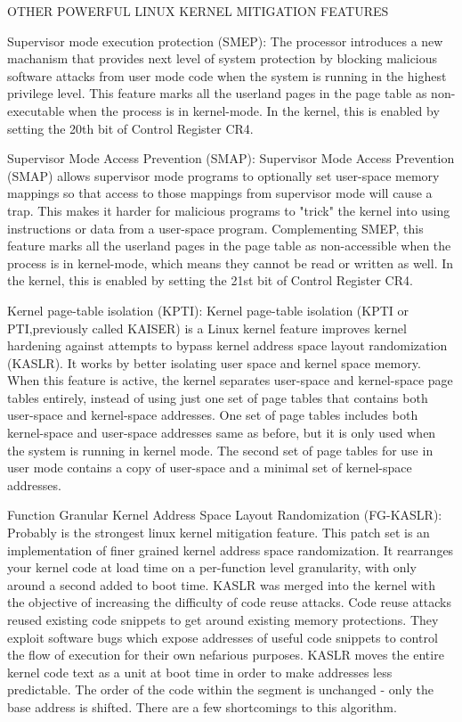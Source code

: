 \documentclass{masterthesis}
\begin{document}
\begin{itemize}
OTHER POWERFUL LINUX KERNEL MITIGATION FEATURES

Supervisor mode execution protection (SMEP):
The processor introduces a new machanism that provides next level of system protection by blocking malicious software attacks from user mode code when the system is running in the highest privilege level.
This feature marks all the userland pages in the page table as non-executable when the process is in kernel-mode. In the kernel, this is enabled by setting the 20th bit of Control Register CR4.

Supervisor Mode Access Prevention (SMAP):
Supervisor Mode Access Prevention (SMAP) allows supervisor mode programs to optionally set user-space memory mappings so that access to those mappings from supervisor mode will cause a trap. This makes it harder for malicious programs to "trick" the kernel into using instructions or data from a user-space program.
Complementing SMEP, this feature marks all the userland pages in the page table as non-accessible when the process is in kernel-mode, which means they cannot be read or written as well. In the kernel, this is enabled by setting the 21st bit of Control Register CR4.

Kernel page-table isolation (KPTI):
Kernel page-table isolation (KPTI or PTI,previously called KAISER) is a Linux kernel feature improves kernel hardening against attempts to bypass kernel address space layout randomization (KASLR). It works by better isolating user space and kernel space memory.
When this feature is active, the kernel separates user-space and kernel-space page tables entirely, instead of using just one set of page tables that contains both user-space and kernel-space addresses. One set of page tables includes both kernel-space and user-space addresses same as before, but it is only used when the system is running in kernel mode. The second set of page tables for use in user mode contains a copy of user-space and a minimal set of kernel-space addresses.

Function Granular Kernel Address Space Layout Randomization (FG-KASLR):
Probably is the strongest linux kernel mitigation feature.
This patch set is an implementation of finer grained kernel address space randomization. It rearranges your kernel code at load time on a per-function level granularity, with only around a second added to boot time.
KASLR was merged into the kernel with the objective of increasing the difficulty of code reuse attacks. Code reuse attacks reused existing code snippets to get around existing memory protections. They exploit software bugs which expose addresses of useful code snippets to control the flow of execution for their own nefarious purposes. KASLR moves the entire kernel
code text as a unit at boot time in order to make addresses less predictable.
The order of the code within the segment is unchanged - only the base address is shifted. There are a few shortcomings to this algorithm.


\end{itemize}
\end{document}
